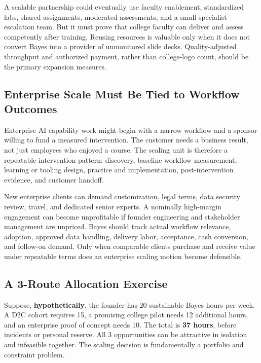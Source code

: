 A scalable partnership could eventually use faculty enablement, standardized labs, shared assignments, moderated assessments, and a small specialist escalation team. But it must prove that college faculty can deliver and assess competently after training. Reusing resources is valuable only when it does not convert Bayes into a provider of unmonitored slide decks. Quality-adjusted throughput and authorized payment, rather than college-logo count, should be the primary expansion measures.

\subsection{Enterprise Scale Must Be Tied to Workflow Outcomes}
\label{sec:enterprise_scale_workflow_outcomes}

Enterprise AI capability work might begin with a narrow workflow and a sponsor willing to fund a measured intervention. The customer needs a business result, not just employees who enjoyed a course. The scaling unit is therefore a repeatable intervention pattern: discovery, baseline workflow measurement, learning or tooling design, practice and implementation, post-intervention evidence, and customer handoff.

New enterprise clients can demand customization, legal terms, data security review, travel, and dedicated senior experts. A nominally high-margin engagement can become unprofitable if founder engineering and stakeholder management are unpriced. Bayes should track actual workflow relevance, adoption, approved data handling, delivery labor, acceptance, cash conversion, and follow-on demand. Only when comparable clients purchase and receive value under repeatable terms does an enterprise scaling motion become defensible.

\subsection{A 3-Route Allocation Exercise}
\label{sec:three_route_allocation_exercise}

Suppose, \textbf{hypothetically}, the founder has 20 sustainable Bayes hours per week. A D2C cohort requires 15, a promising college pilot needs 12 additional hours, and an enterprise proof of concept needs 10. The total is \textbf{37 hours}, before incidents or personal reserve. All 3 opportunities can be attractive in isolation and infeasible together. The scaling decision is fundamentally a portfolio and constraint problem.

